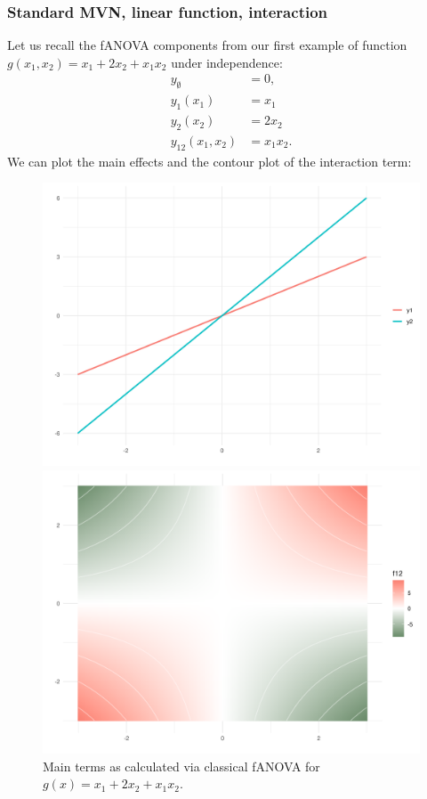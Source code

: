 \subsubsection*{Standard MVN, linear function, interaction}
Let us recall the fANOVA components from our first example of function $g(x_1, x_2) = x_1 + 2 x_2 + x_1 x_2$ under independence:
\begin{align*}
y_{\emptyset} &= 0, \\
y_1(x_1) &= x_1\\
y_2(x_2) &= 2x_2\\
y_{12}(x_1, x_2) &= x_1x_2.
\end{align*}
We can plot the main effects and the contour plot of the interaction term:
\begin{figure}[htpb]
    \centering
    \begin{minipage}[t]{0.49\textwidth}
        \centering
        \includegraphics[width=\textwidth]{images/p_main_effect_ex1.png}
        \caption{Main terms as calculated via classical fANOVA for $g(x) = x_1 + 2 x_2 + x_1 x_2$.}
        \label{fig:main_effects_ex1}
    \end{minipage}%
    \hfill
    \begin{minipage}[t]{0.49\textwidth}
        \centering
        \includegraphics[width=\textwidth]{images/p_contour_ex1.png}

\end{minipage}
\end{figure}
